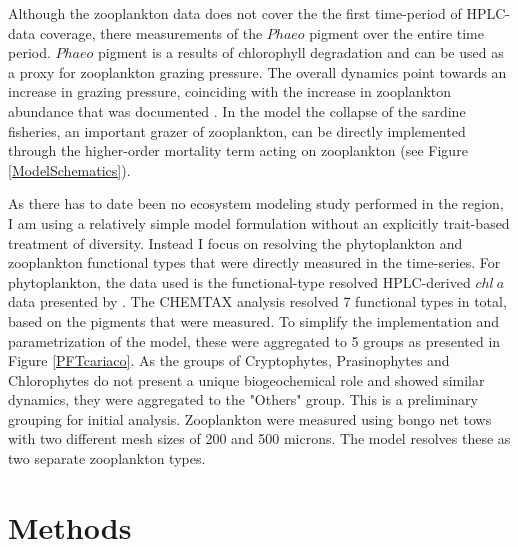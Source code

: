 Although the zooplankton data does not cover the the first time-period of HPLC-data coverage, there measurements of the $Phaeo$ pigment over the entire time period. 
$Phaeo$ pigment is a results of chlorophyll degradation and can be used as a proxy for zooplankton grazing pressure. The overall dynamics point towards an increase in grazing pressure, coinciding with the increase in zooplankton abundance that was documented \citep{Pinckney2015}. In the model the collapse of the sardine fisheries, an important grazer of zooplankton, can be directly implemented through the higher-order mortality term acting on zooplankton (see Figure \ref{ModelSchematics}). 

As there has to date been no ecosystem modeling study performed in the region,
I am using a relatively simple model formulation without an explicitly trait-based treatment of diversity.
Instead I focus on resolving the phytoplankton and zooplankton functional types that were directly measured in the time-series. For phytoplankton, the data used is the functional-type resolved HPLC-derived $chl~a$ data presented by \citet{Pinckney2015}.
 The CHEMTAX analysis resolved 7 functional types in total, based on the pigments that were measured. To simplify the implementation and parametrization of the model, these were aggregated to 5 groups as presented in Figure \ref{PFTcariaco}. 
 As the groups of Cryptophytes, Prasinophytes and Chlorophytes do not present a unique biogeochemical role and showed similar dynamics, they were aggregated to the "Others" group. This is a preliminary grouping for initial analysis. Zooplankton were measured using bongo net tows with two different mesh sizes of 200 and 500 microns. The model resolves these as two separate zooplankton types.





\section{Methods}

